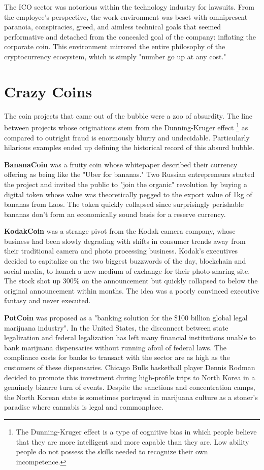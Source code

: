 The ICO sector was notorious within the technology industry for lawsuits. From
the employee's perspective, the work environment was beset with omnipresent
paranoia, conspiracies, greed, and aimless technical goals that seemed
performative and detached from the concealed goal of the company: inflating the
corporate coin. This environment mirrored the entire philosophy of the
cryptocurrency ecosystem, which is simply "number go up at any cost."

\section{Crazy Coins}

The coin projects that came out of the bubble were a zoo of absurdity. The line
between projects whose originations stem from the Dunning-Kruger effect
\footnote{The Dunning-Kruger effect is a type of cognitive bias in which people
believe that they are more intelligent and more capable than they are. Low
ability people do not possess the skills needed to recognize their own
incompetence.} as compared to outright fraud is enormously blurry and
undecidable. Particularly hilarious examples ended up defining the historical
record of this absurd bubble.

\textbf{BananaCoin} was a fruity coin whose whitepaper described their currency
offering as being like the "Uber for bananas." Two Russian entrepreneurs started
the project and invited the public to "join the organic" revolution by buying a
digital token whose value was theoretically pegged to the export value of 1kg of
bananas from Laos. The token quickly collapsed since surprisingly perishable
bananas don't form an economically sound basis for a reserve currency.

\textbf{KodakCoin} was a strange pivot from the Kodak camera company, whose
business had been slowly degrading with shifts in consumer trends away from
their traditional camera and photo processing business. Kodak's executives
decided to capitalize on the two biggest buzzwords of the day, blockchain and
social media, to launch a new medium of exchange for their photo-sharing site.
The stock shot up 300\% on the announcement but quickly collapsed to below the
original announcement within months. The idea was a poorly convinced executive
fantasy and never executed.

\textbf{PotCoin} was proposed as a "banking solution for the \$100 billion
global legal marijuana industry". In the United States, the disconnect between
state legalization and federal legalization has left many financial institutions
unable to bank marijuana dispensaries without running afoul of federal laws. The
compliance costs for banks to transact with the sector are as high as the
customers of these dispensaries. Chicago Bulls basketball player Dennis Rodman
decided to promote this investment during high-profile trips to North Korea in a
genuinely bizarre turn of events. Despite the sanctions and concentration camps,
the North Korean state is sometimes portrayed in marijuana culture as a stoner's
paradise where cannabis is legal and commonplace.

